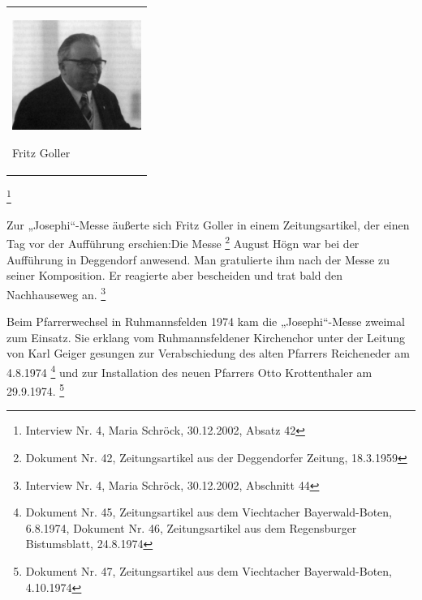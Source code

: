 \begin{center}
\begin{minipage}{4.598cm}
\begin{flushleft}
\tablefirsthead{}
\tablehead{}
\tabletail{}
\tablelasttail{}
\begin{supertabular}{m{4.3980002cm}}

\includegraphics[width=4.216cm,height=3.577cm]{pictures/zulassungsarbeit-img107.jpg}

Fritz Goller \\
\end{supertabular}
\end{flushleft}
\end{minipage}
\end{center}




\footnote{
Interview Nr. 4, Maria Schröck, 30.12.2002, Absatz 42}

Zur „Josephi“-Messe äußerte sich Fritz Goller in einem Zeitungsartikel,
der einen Tag vor der Aufführung erschien:\zitat{ }Die
Messe \footnote{Dokument
Nr. 42, Zeitungsartikel aus der Deggendorfer Zeitung, 18.3.1959} August
Högn war bei der Aufführung in Deggendorf anwesend. Man gratulierte ihm
nach der Messe zu seiner Komposition. Er reagierte aber bescheiden und
trat bald den Nachhauseweg an. \footnote{Interview Nr. 4, Maria
Schröck, 30.12.2002, Abschnitt 44}

Beim Pfarrerwechsel in Ruhmannsfelden 1974 kam die „Josephi“-Messe
zweimal zum Einsatz. Sie erklang vom Ruhmannsfeldener Kirchenchor unter
der Leitung von Karl Geiger gesungen zur Verabschiedung des alten
Pfarrers Reicheneder am 4.8.1974 \footnote{Dokument Nr. 45,
Zeitungsartikel aus dem Viechtacher Bayerwald-Boten, 6.8.1974, Dokument
Nr. 46, Zeitungsartikel aus dem Regensburger Bistumsblatt, 24.8.1974}
und zur Installation des neuen Pfarrers Otto Krottenthaler am
29.9.1974. \footnote{Dokument Nr. 47, Zeitungsartikel aus dem
Viechtacher Bayerwald-Boten, 4.10.1974}

